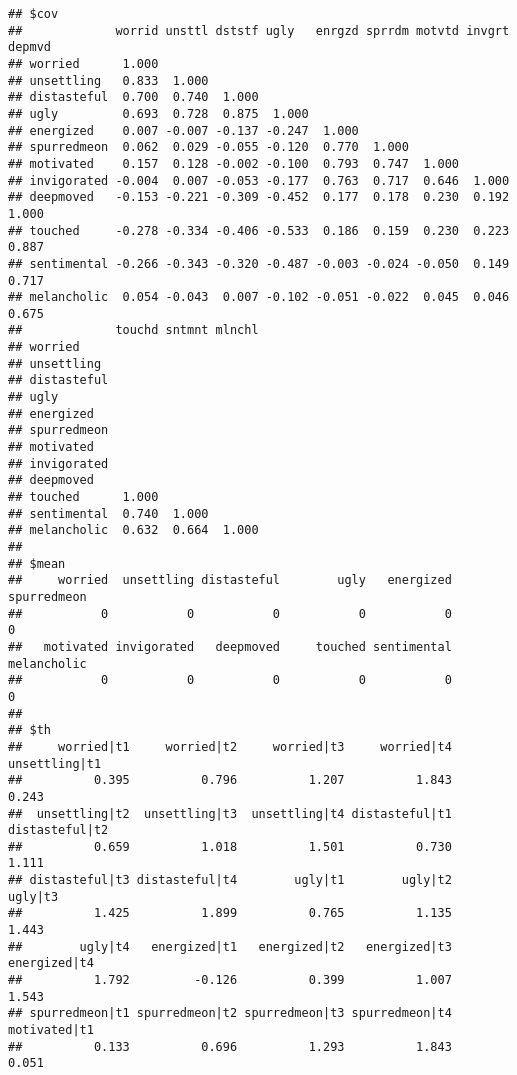 \documentclass[
]{article}
\begin{document}
\begin{verbatim}
## $cov
##             worrid unsttl dststf ugly   enrgzd sprrdm motvtd invgrt depmvd
## worried      1.000                                                        
## unsettling   0.833  1.000                                                 
## distasteful  0.700  0.740  1.000                                          
## ugly         0.693  0.728  0.875  1.000                                   
## energized    0.007 -0.007 -0.137 -0.247  1.000                            
## spurredmeon  0.062  0.029 -0.055 -0.120  0.770  1.000                     
## motivated    0.157  0.128 -0.002 -0.100  0.793  0.747  1.000              
## invigorated -0.004  0.007 -0.053 -0.177  0.763  0.717  0.646  1.000       
## deepmoved   -0.153 -0.221 -0.309 -0.452  0.177  0.178  0.230  0.192  1.000
## touched     -0.278 -0.334 -0.406 -0.533  0.186  0.159  0.230  0.223  0.887
## sentimental -0.266 -0.343 -0.320 -0.487 -0.003 -0.024 -0.050  0.149  0.717
## melancholic  0.054 -0.043  0.007 -0.102 -0.051 -0.022  0.045  0.046  0.675
##             touchd sntmnt mlnchl
## worried                         
## unsettling                      
## distasteful                     
## ugly                            
## energized                       
## spurredmeon                     
## motivated                       
## invigorated                     
## deepmoved                       
## touched      1.000              
## sentimental  0.740  1.000       
## melancholic  0.632  0.664  1.000
## 
## $mean
##     worried  unsettling distasteful        ugly   energized spurredmeon 
##           0           0           0           0           0           0 
##   motivated invigorated   deepmoved     touched sentimental melancholic 
##           0           0           0           0           0           0 
## 
## $th
##     worried|t1     worried|t2     worried|t3     worried|t4  unsettling|t1 
##          0.395          0.796          1.207          1.843          0.243 
##  unsettling|t2  unsettling|t3  unsettling|t4 distasteful|t1 distasteful|t2 
##          0.659          1.018          1.501          0.730          1.111 
## distasteful|t3 distasteful|t4        ugly|t1        ugly|t2        ugly|t3 
##          1.425          1.899          0.765          1.135          1.443 
##        ugly|t4   energized|t1   energized|t2   energized|t3   energized|t4 
##          1.792         -0.126          0.399          1.007          1.543 
## spurredmeon|t1 spurredmeon|t2 spurredmeon|t3 spurredmeon|t4   motivated|t1 
##          0.133          0.696          1.293          1.843          0.051 

\end{verbatim}
\end{document}

